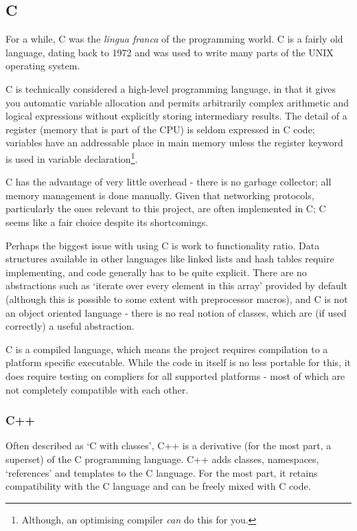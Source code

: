 \documentclass[10pt,a4paper,notitlepage,twoside]{report}
\begin{document}
\subsection{C}
For a while, C was the \emph{lingua franca} of the programming world. C is a fairly old language, dating back to 1972 and was used to write many parts of the UNIX operating system\cite{tcpl}.

C is technically considered a high-level programming language, in that it gives you automatic variable allocation and permits arbitrarily complex arithmetic and logical expressions without explicitly storing intermediary results. The detail of a register (memory that is part of the CPU) is seldom expressed in C code; variables have an addressable place in main memory unless the register keyword is used in variable declaration\footnote{Although, an optimising compiler \emph{can} do this for you.}.

C has the advantage of very little overhead - there is no garbage collector; all memory management is done manually. Given that networking protocols, particularly the ones relevant to this project, are often implemented in C; C seems like a fair choice despite its shortcomings.

Perhaps the biggest issue with using C is work to functionality ratio. Data structures available in other languages like linked lists and hash tables require implementing, and code generally has to be quite explicit. There are no abstractions such as `iterate over every element in this array' provided by default (although this is possible to some extent with preprocessor macros), and C is not an object oriented language - there is no real notion of classes, which are (if used correctly) a useful abstraction.

C is a compiled language, which means the project requires compilation to a platform specific executable. While the code in itself is no less portable for this, it does require testing on compliers for all supported platforms - most of which are not completely compatible with each other.

\subsubsection{C++}
Often described as `C with classes', C++ is a derivative (for the most part, a superset) of the C programming language\cite{tcpppl}.
C++ adds classes, namespaces, `references' and templates to the C language. For the most part, it retains compatibility with the C language and can be freely mixed with C code.
\end{document}
